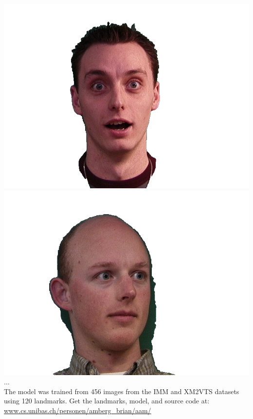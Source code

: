 \documentclass[landscape,a2paper,fontscale=0.6]{baposter}
\begin{document}
\begin{poster}
{   \includegraphics[width=0.2\linewidth]{09_6m_masked}%
   \includegraphics[width=0.2\linewidth]{33_4m_masked}%
   $\dots$\\
   The model was trained from 456 images from the IMM and XM2VTS datasets using
   120 landmarks. Get the landmarks, model, and source code at:\\
   \mbox{\url{www.cs.unibas.ch/personen/amberg_brian/aam/}}
   }



\end{poster}
\end{document}
